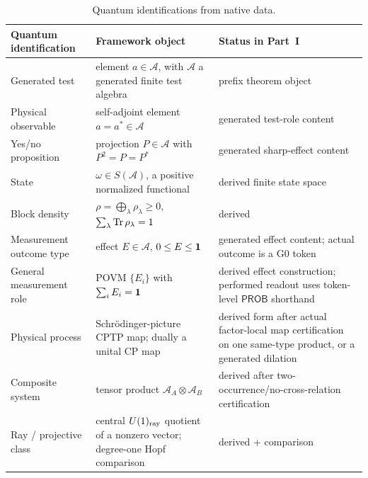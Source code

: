 \documentclass[12pt,a4paper]{article}
\begin{document}
\begin{table}[!htbp]
\centering
\caption[Quantum identifications from native data]{Quantum identifications from native data.}
\label{p4:tab:selected-identifications}
\small
\renewcommand{\arraystretch}{1.2}
\setlength{\tabcolsep}{4pt}
\begin{tabularx}{\textwidth}{>{\raggedright\arraybackslash}p{}
                                >{\raggedright\arraybackslash}X
                                >{\raggedright\arraybackslash}p{}}
\toprule
\textbf{Quantum identification} & \textbf{Framework object} & \textbf{Status in Part~I} \\
\midrule
Generated test & element \(a\in\mathcal A\), with \(\mathcal A\) a generated finite test algebra & prefix theorem object \\
Physical observable & self-adjoint element \(a=a^*\in\mathcal A\) & generated test-role content \\

Yes/no proposition & projection \(P\in\mathcal A\) with \(P^2=P=P^*\) & generated sharp-effect content \\

State & \(\omega\in S(\mathcal A)\), a positive normalized functional & derived finite state space \\

Block density & \(\rho=\bigoplus_\lambda\rho_\lambda\ge0\), \(\sum_\lambda\operatorname{Tr}\rho_\lambda=1\) & derived \\

Measurement outcome type & effect \(E\in\mathcal A\), \(0\le E\le\mathbf{1}\) & generated effect content; actual outcome is a G0 token \\

General measurement role & POVM \(\{E_i\}\) with \(\sum_i E_i=\mathbf{1}\) & derived effect construction; performed readout uses token-level \(\mathsf{PROB}\) shorthand \\

Physical process & Schr\"odinger-picture CPTP map; dually a unital CP map & derived form after actual factor-local map certification on one same-type product, or a generated dilation \\

Composite system & tensor product \(\mathcal A_A\otimes\mathcal A_B\) & derived after two-occurrence/no-cross-relation certification \\

Ray / projective class & central \(U(1)_{\rm ray}\) quotient of a nonzero vector; degree-one Hopf comparison & derived + comparison \\


\end{tabularx}
\end{table}
\end{document}
